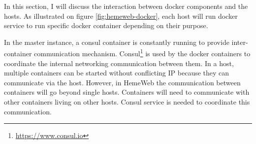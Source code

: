 \vspace{1cm}

\noindent%
\begin{minipage}{\linewidth}%
\label{fig:hemeweb-docker}%
\end{minipage}

\vspace{1cm}

In this section, I will discuss the interaction between docker components and the hosts. As illustrated on figure \ref{fig:hemeweb-docker}, each host will run docker service to run specific docker container depending on their purpose.

In the master instance, a consul container is constantly running to provide inter-container communication mechanism. Consul\footnote{\url{https://www.consul.io}} is used by the docker containers to coordinate the internal networking communication between them. In a host, multiple containers can be started without conflicting IP because they can communicate via the host. However, in HemeWeb the communication between containers will go beyond single hosts. Containers will need to communicate with other containers living on other hosts. Consul service is needed to coordinate this communication.

